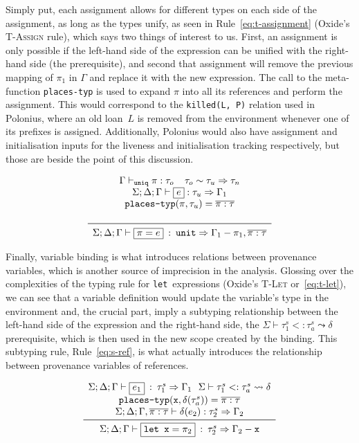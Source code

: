 \documentclass[11pt,a4paper,twoside,openany,draft]{report}
\newcommand{\InRust}[1]{\texttt{#1}}
\newcommand{\InDatalog}[1]{\texttt{#1}}
\newcommand{\expression}[1]{\boxed{#1}}
\newcommand{\ntyperule}[2]{\begin{array}{c}#1\\\midrule\raisebox{1pt}{\strut}#2\end{array}}
\begin{document}
Simply put, each assignment allows for different types on each side of the
assignment, as long as the types unify, as seen in Rule~\eqref{eq:t-assignment}
(Oxide's \textsc{T-Assign} rule), which says two things of interest to us.
First, an assignment is only possible if the left-hand side of the expression
can be unified with the right-hand side (the prerequisite), and second that
assignment will remove the previous mapping of $\pi_1$ in $\Gamma$ and replace
it with the new expression. The call to the meta-function \texttt{places-typ} is
used to expand $\pi$ into all its references and perform the assignment. This
would correspond to the \InDatalog{killed(L, P)} relation used in Polonius,
where an old loan~$L$ is removed from the environment whenever one of its prefixes
is assigned. Additionally, Polonius would also have assignment and
initialisation inputs for the liveness and initialisation tracking respectively,
but those are beside the point of this discussion.

\begin{equation}\label{eq:t-assignment}
  \ntyperule{
    \Gamma \vdash_{\texttt{uniq}} \pi : \tau_o \:\:\:\:\:
    \tau_o \sim \tau_u \Rightarrow \tau_n \\
    \Sigma ; \Delta ; \Gamma \vdash \expression{e} : \tau_u \Rightarrow \Gamma_1 \\
    \texttt{places-typ}(\pi, \tau_u) = \overline{\pi : \tau} \\
  }
  {
    \Sigma ; \Delta ; \Gamma \vdash \expression{\pi = e} \: : \: \texttt{unit} \Rightarrow \Gamma_1 - \pi_1, \overline{\pi : \tau}
  }
\end{equation}

Finally, variable binding is what introduces relations between provenance
variables, which is another source of imprecision in the analysis. Glossing over
the complexities of the typing rule for \InRust{let}~expressions (Oxide's
\textsc{T-Let} or~\eqref{eq:t-let}), we can see that a variable definition would
update the variable's type in the environment and, the crucial part, imply a
subtyping relationship between the left-hand side of the expression and the
right-hand side, the $\Sigma \vdash \tau_1 ^s <: \tau_a^s \leadsto \delta$
prerequisite, which is then used in the new scope created by the binding. This
subtyping rule, Rule~\eqref{eq:s-ref}, is what actually introduces the
relationship between provenance variables of references.

\begin{equation}\label{eq:t-let}
  \ntyperule{
    \Sigma ; \Delta ; \Gamma \vdash \expression{e_1} \: : \: \tau_1^s \Rightarrow \Gamma_1
    \:\:\: \Sigma \vdash \tau_1 ^s <: \tau_a^s \leadsto \delta \\
    \texttt{places-typ}(\mathtt{x}, \delta(\tau^s_a)) = \overline{\pi : \tau} \\
    \Sigma ; \Delta ; \Gamma, \overline{\pi : \tau} \vdash \delta(e_2) : \tau_2^s \Rightarrow \Gamma_2
  }
  {\Sigma ; \Delta ; \Gamma \vdash \expression{\texttt{let } \mathtt{x} = \pi_2} \: : \: \tau_2^s \Rightarrow \Gamma_2 - \mathtt{x}}
\end{equation}
\end{document}
